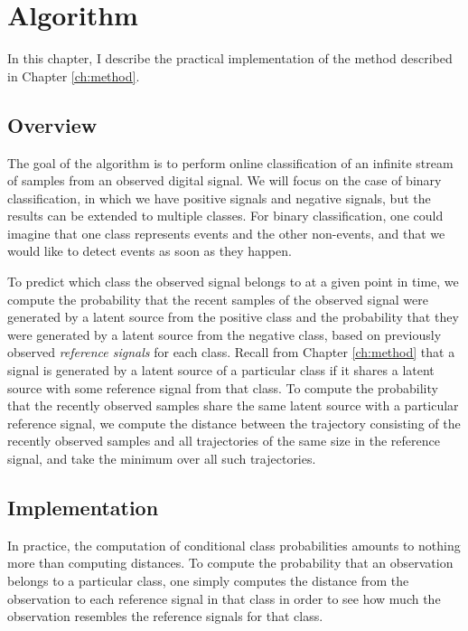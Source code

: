 \chapter{Algorithm}
\label{ch:alg}


In this chapter, I describe the practical implementation of the method described
in Chapter \ref{ch:method}.

\section{Overview}

The goal of the algorithm is to perform online classification of an infinite
stream of samples from an observed digital signal. We will focus on the case of
binary classification, in which we have positive signals and negative signals,
but the results can be extended to multiple classes.  For binary classification,
one could imagine that one class represents events and the other non-events, and
that we would like to detect events as soon as they happen.

To predict which class the observed signal belongs to at a given point in time,
we compute the probability that the recent samples of the observed signal were
generated by a latent source from the positive class and the probability that
they were generated by a latent source from the negative class, based on
previously observed {\em reference signals} for each class. Recall from Chapter
\ref{ch:method} that a signal is generated by a latent source of a particular
class if it shares a latent source with some reference signal from that class.
To compute the probability that the recently observed samples share the same
latent source with a particular reference signal, we compute the distance
between the trajectory consisting of the recently observed samples and all
trajectories of the same size in the reference signal, and take the minimum over
all such trajectories.

\section{Implementation}
In practice, the computation of conditional class probabilities amounts to
nothing more than computing distances. To compute the probability that an
observation belongs to a particular class, one simply computes the distance from
the observation to each reference signal in that class in order to see how much
the observation resembles the reference signals for that class.

